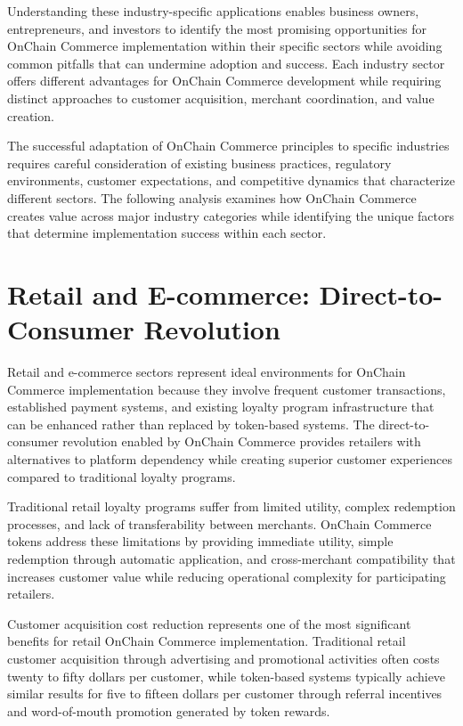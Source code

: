 \documentclass[
  Letterpaper,
]{scrbook}
\begin{document}
Understanding these industry-specific applications enables business
owners, entrepreneurs, and investors to identify the most promising
opportunities for OnChain Commerce implementation within their specific
sectors while avoiding common pitfalls that can undermine adoption and
success. Each industry sector offers different advantages for OnChain
Commerce development while requiring distinct approaches to customer
acquisition, merchant coordination, and value creation.

The successful adaptation of OnChain Commerce principles to specific
industries requires careful consideration of existing business
practices, regulatory environments, customer expectations, and
competitive dynamics that characterize different sectors. The following
analysis examines how OnChain Commerce creates value across major
industry categories while identifying the unique factors that determine
implementation success within each sector.

\section{Retail and E-commerce: Direct-to-Consumer
Revolution}\label{retail-and-e-commerce-direct-to-consumer-revolution}

Retail and e-commerce sectors represent ideal environments for OnChain
Commerce implementation because they involve frequent customer
transactions, established payment systems, and existing loyalty program
infrastructure that can be enhanced rather than replaced by token-based
systems. The direct-to-consumer revolution enabled by OnChain Commerce
provides retailers with alternatives to platform dependency while
creating superior customer experiences compared to traditional loyalty
programs.

Traditional retail loyalty programs suffer from limited utility, complex
redemption processes, and lack of transferability between merchants.
OnChain Commerce tokens address these limitations by providing immediate
utility, simple redemption through automatic application, and
cross-merchant compatibility that increases customer value while
reducing operational complexity for participating retailers.

Customer acquisition cost reduction represents one of the most
significant benefits for retail OnChain Commerce implementation.
Traditional retail customer acquisition through advertising and
promotional activities often costs twenty to fifty dollars per customer,
while token-based systems typically achieve similar results for five to
fifteen dollars per customer through referral incentives and
word-of-mouth promotion generated by token rewards.
\end{document}
